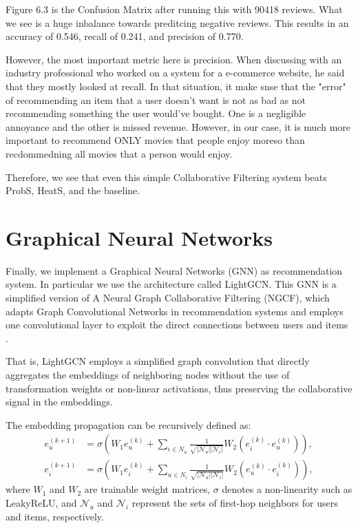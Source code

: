 \documentclass[12pt]{article}
\numberwithin{equation}{section}
\begin{document}
Figure 6.3 is the Confusion Matrix after running this with 90418 reviews. What we see is a huge inbalance towards preditcing negative reviews. This results in an accuracy of 0.546, recall of 0.241, and precision of 0.770.

However, the most important metric here is precision. When discussing with an industry professional who worked on a system for a e-commerce website, he said that they mostly looked at recall. In that situation, it make snse that the "error" of recommending an item that a user doesn't want is not as bad as not recommending something the user would've bought. One is a negligible annoyance and the other is missed revenue. However, in our case, it is much more important to recommend ONLY movies that people enjoy moreso than recdommedning all movies that a person would enjoy. 

Therefore, we see that even this simple Collaborative Filtering system beats ProbS, HeatS, and the baseline.

\section{Graphical Neural Networks}

Finally, we implement a Graphical Neural Networks (GNN) as recommendation system. In particular we use the architecture called LightGCN. This GNN is a simplified version of A Neural Graph Collaborative Filtering (NGCF), which adapts Graph Convolutional Networks in recommendation systems and employs one convolutional layer to exploit the direct connections between users and items \cite{lightgcn}. 

That is, LightGCN employs a simplified graph convolution that directly aggregates the embeddings of neighboring nodes without the use of transformation weights or non-linear activations, thus preserving the collaborative signal in the embeddings.

The embedding propagation can be recursively defined as:
\begin{align*}
	e_u^{(k+1)} &= \sigma \left( W_1 e_u^{(k)} + \sum_{i \in N_u} \frac{1}{\sqrt{|\mathcal{N}_u||\mathcal{N}_i|}} W_2 (e_i^{(k)} \cdot e_u^{(k)}) \right), \\
	e_i^{(k+1)} &= \sigma \left( W_1 e_i^{(k)} + \sum_{u \in N_i} \frac{1}{\sqrt{|\mathcal{N}_u||\mathcal{N}_i|}} W_2 (e_u^{(k)} \cdot e_i^{(k)}) \right),
\end{align*}
where $W_1$ and $W_2$ are trainable weight matrices, $\sigma$ denotes a non-linearity such as LeakyReLU, and $\mathcal{N}_u$ and $\mathcal{N}_i$ represent the sets of first-hop neighbors for users and items, respectively.
\end{document}
